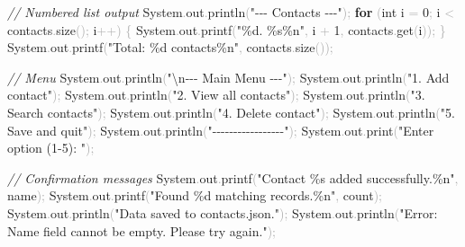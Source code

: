 \documentclass[
  justified,
  openright,
]{tufte-book}
\newcommand{\KeywordTok}[1]{\textcolor{CodeKeyword}{\textbf{#1}}}  %
\newcommand{\StringTok}[1]{\textcolor{CodeString}{#1}}              %
\newcommand{\CommentTok}[1]{\textcolor{CodeComment}{\textit{#1}}}  %
\newcommand{\CodeNumTok}[1]{\textcolor{CodeNumber}{#1}}             %
\newcommand{\CodeFuncTok}[1]{\textcolor{CodeKeyword}{#1}}           %
\newcommand{\CodeTypeTok}[1]{\textcolor{CodeType}{#1}}              %
\newcommand{\OperatorTok}[1]{\textcolor{DarkGray}{#1}}              %
\newenvironment{Shaded}{%
  \begin{mdframed}[style=TufteCode]%
}{%
  \end{mdframed}%
}
\begin{document}
\begin{Shaded}
\begin{Highlighting}[]
\CommentTok{// Numbered list output}
System\OperatorTok{.}\CodeFuncTok{out}\OperatorTok{.}\CodeFuncTok{println}\OperatorTok{(}\StringTok{"{-}{-}{-} Contacts {-}{-}{-}"}\OperatorTok{);}
\KeywordTok{for} \OperatorTok{(}\CodeTypeTok{int} i \OperatorTok{=} \CodeNumTok{0}\OperatorTok{;} i \OperatorTok{\textless{}} contacts\OperatorTok{.}\CodeFuncTok{size}\OperatorTok{();} i\OperatorTok{++)} \OperatorTok{\{}
    System\OperatorTok{.}\CodeFuncTok{out}\OperatorTok{.}\CodeFuncTok{printf}\OperatorTok{(}\StringTok{"}\StringTok{\%d}\StringTok{. }\StringTok{\%s\%n}\StringTok{"}\OperatorTok{,} i \OperatorTok{+} \CodeNumTok{1}\OperatorTok{,} contacts\OperatorTok{.}\CodeFuncTok{get}\OperatorTok{(}i\OperatorTok{));}
\OperatorTok{\}}
System\OperatorTok{.}\CodeFuncTok{out}\OperatorTok{.}\CodeFuncTok{printf}\OperatorTok{(}\StringTok{"Total: }\StringTok{\%d}\StringTok{ contacts}\StringTok{\%n}\StringTok{"}\OperatorTok{,} contacts\OperatorTok{.}\CodeFuncTok{size}\OperatorTok{());}
 
\CommentTok{// Menu}
System\OperatorTok{.}\CodeFuncTok{out}\OperatorTok{.}\CodeFuncTok{println}\OperatorTok{(}\StringTok{"}\StringTok{\textbackslash{}n}\StringTok{{-}{-}{-} Main Menu {-}{-}{-}"}\OperatorTok{);}
System\OperatorTok{.}\CodeFuncTok{out}\OperatorTok{.}\CodeFuncTok{println}\OperatorTok{(}\StringTok{"1. Add contact"}\OperatorTok{);}
System\OperatorTok{.}\CodeFuncTok{out}\OperatorTok{.}\CodeFuncTok{println}\OperatorTok{(}\StringTok{"2. View all contacts"}\OperatorTok{);}
System\OperatorTok{.}\CodeFuncTok{out}\OperatorTok{.}\CodeFuncTok{println}\OperatorTok{(}\StringTok{"3. Search contacts"}\OperatorTok{);}
System\OperatorTok{.}\CodeFuncTok{out}\OperatorTok{.}\CodeFuncTok{println}\OperatorTok{(}\StringTok{"4. Delete contact"}\OperatorTok{);}
System\OperatorTok{.}\CodeFuncTok{out}\OperatorTok{.}\CodeFuncTok{println}\OperatorTok{(}\StringTok{"5. Save and quit"}\OperatorTok{);}
System\OperatorTok{.}\CodeFuncTok{out}\OperatorTok{.}\CodeFuncTok{println}\OperatorTok{(}\StringTok{"{-}{-}{-}{-}{-}{-}{-}{-}{-}{-}{-}{-}{-}{-}{-}{-}{-}"}\OperatorTok{);}
System\OperatorTok{.}\CodeFuncTok{out}\OperatorTok{.}\CodeFuncTok{print}\OperatorTok{(}\StringTok{"Enter option (1{-}5): "}\OperatorTok{);}
 
\CommentTok{// Confirmation messages}
System\OperatorTok{.}\CodeFuncTok{out}\OperatorTok{.}\CodeFuncTok{printf}\OperatorTok{(}\StringTok{"Contact \textquotesingle{}}\StringTok{\%s}\StringTok{\textquotesingle{} added successfully.}\StringTok{\%n}\StringTok{"}\OperatorTok{,} name\OperatorTok{);}
System\OperatorTok{.}\CodeFuncTok{out}\OperatorTok{.}\CodeFuncTok{printf}\OperatorTok{(}\StringTok{"Found }\StringTok{\%d}\StringTok{ matching records.}\StringTok{\%n}\StringTok{"}\OperatorTok{,} count\OperatorTok{);}
System\OperatorTok{.}\CodeFuncTok{out}\OperatorTok{.}\CodeFuncTok{println}\OperatorTok{(}\StringTok{"Data saved to contacts.json."}\OperatorTok{);}
System\OperatorTok{.}\CodeFuncTok{out}\OperatorTok{.}\CodeFuncTok{println}\OperatorTok{(}\StringTok{"Error: Name field cannot be empty. Please try again."}\OperatorTok{);}
\end{Highlighting}
\end{Shaded}
\end{document}
